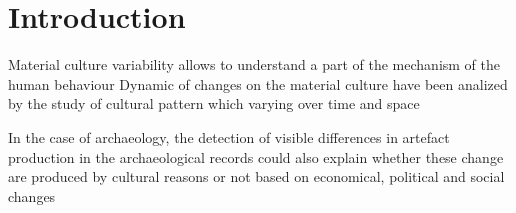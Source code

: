 \documentclass[review]{elsarticle}
\begin{document}



\section{Introduction}


Material culture variability allows to understand a part of the mechanism of the human behaviour \citep{basalla1988evolution}%
Dynamic of changes on the material culture have been analized by the study of cultural pattern which varying over time and space \citep{eerkens_jelmer_cultural_2007, lycett_cultural_2015} %

In the case of archaeology, the detection of visible differences in artefact production in the archaeological records could also explain whether these change are produced by cultural reasons or not based on economical, political and social changes %
\end{document}
